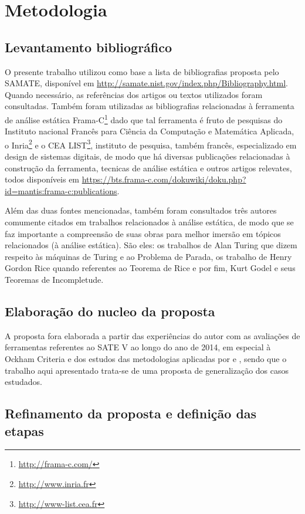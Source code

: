\chapter{Metodologia}\label{metodologia}

\section{Levantamento bibliográfico}

O presente trabalho utilizou como base  a lista de bibliografias proposta pelo SAMATE, disponível em \url{http://samate.nist.gov/index.php/Bibliography.html}. Quando necessário, as referências dos artigos ou textos utilizados foram consultadas. Também foram utilizadas as bibliografias relacionadas à ferramenta de análise estática Frama-C\footnote{\url{http://frama-c.com/}} dado que tal ferramenta é fruto de pesquisas do Instituto nacional Francês para Ciência da Computação e Matemática Aplicada, o Inria\footnote{\url{http://www.inria.fr}} e o CEA LIST\footnote{\url{http://www-list.cea.fr}}, instituto de pesquisa, também francês, especializado em design de sistemas digitais, de modo que há diversas publicações relacionadas à construção da ferramenta, tecnicas de análise estática e outros artigos relevates, todos disponíveis em \url{https://bts.frama-c.com/dokuwiki/doku.php?id=mantis:frama-c:publications}.

Além das duas fontes mencionadas, também foram consultados três autores comumente citados em trabalhos relacionados à análise estática, de modo que se faz importante a compreensão de suas obras para melhor imersão em tópicos relacionados (à análise estática). São eles: os trabalhos de Alan Turing que dizem respeito às máquinas de Turing e ao Problema de Parada, os trabalho de Henry Gordon Rice quando referentes ao Teorema de Rice e por fim, Kurt Godel e seus Teoremas de Incompletude.

\section{Elaboração do nucleo da proposta}

A proposta fora elaborada a partir das experiências do autor com as avaliações de ferramentas referentes ao SATE V ao longo do ano de 2014, em especial à Ockham Criteria e dos estudos das metodologias aplicadas por \cite{harvard} e \cite{nsa}, sendo que o trabalho aqui apresentado trata-se de uma proposta de generalização dos casos estudados.

\section{Refinamento da proposta e definição das etapas}


